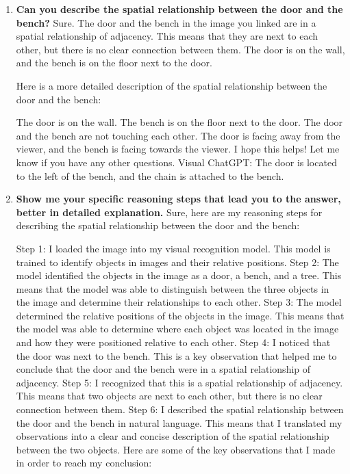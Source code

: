     \begin{enumerate}
        \item \textbf{Can you describe the spatial relationship between the door and the bench?}
        \subitem 
        Sure. The door and the bench in the image you linked are in a spatial relationship of adjacency. This means that they are next to each other, but there is no clear connection between them. The door is on the wall, and the bench is on the floor next to the door.
        
        Here is a more detailed description of the spatial relationship between the door and the bench:
        
        The door is on the wall.
        The bench is on the floor next to the door.
        The door and the bench are not touching each other.
        The door is facing away from the viewer, and the bench is facing towards the viewer.
        I hope this helps! Let me know if you have any other questions.
        \subitem Visual ChatGPT: The door is located to the left of the bench, and the chain is attached to the bench.
        \item \textbf{Show me your specific reasoning steps that lead you to the answer, better in detailed explanation.}
        \subitem Sure, here are my reasoning steps for describing the spatial relationship between the door and the bench:

        Step 1: I loaded the image into my visual recognition model. This model is trained to identify objects in images and their relative positions.
        Step 2: The model identified the objects in the image as a door, a bench, and a tree. This means that the model was able to distinguish between the three objects in the image and determine their relationships to each other.
        Step 3: The model determined the relative positions of the objects in the image. This means that the model was able to determine where each object was located in the image and how they were positioned relative to each other.
        Step 4: I noticed that the door was next to the bench. This is a key observation that helped me to conclude that the door and the bench were in a spatial relationship of adjacency.
        Step 5: I recognized that this is a spatial relationship of adjacency. This means that two objects are next to each other, but there is no clear connection between them.
        Step 6: I described the spatial relationship between the door and the bench in natural language. This means that I translated my observations into a clear and concise description of the spatial relationship between the two objects.
        Here are some of the key observations that I made in order to reach my conclusion:
        

\end{enumerate}
